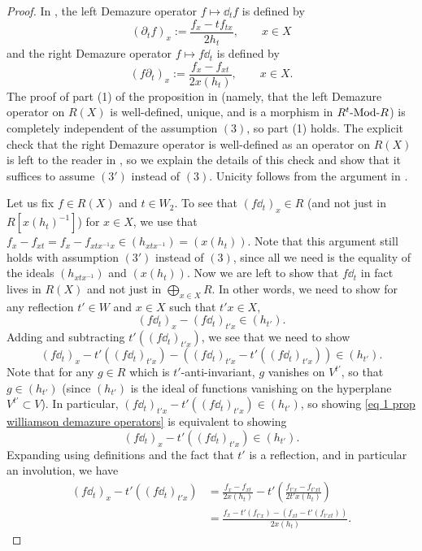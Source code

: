 \begin{proof}
In \cite{WillSingular}, the left Demazure operator $f \mapsto \dd_tf$ is defined by
\begin{equation*}
    (\partial_tf)_x := \frac{f_x - tf_{tx}}{2h_t}, \qquad x \in X
  \end{equation*} 
and the right Demazure operator $f\mapsto f\dd_t$ is defined by
\begin{equation*}
  (f\partial_t)_x := \frac{f_x - f_{xt}}{2x(h_t)},\qquad x\in X.
\end{equation*}
The proof of part (1) of the proposition in \cite{WillSingular} (namely, that the left Demazure operator on $R(X)$ is well-defined, unique, and is a morphism in $\text{${R^t}$-Mod-${R}$}$) is completely independent of the assumption $\hyperref[assumption 3]{(3)}$, so part (1) holds.
The explicit check that the right Demazure operator is well-defined as an operator on $R(X)$ is left to the reader in \cite{WillSingular}, so we explain the details of this check and show that it suffices to assume $\hyperref[assumption 3']{(3')}$ instead of $\hyperref[assumption 3]{(3)}$.  Unicity follows from the argument in \cite{WillSingular}.

Let us fix $f \in R(X)$ and $t\in W_2$. To see that $(f\dd_t)_x \in R$ (and not just in $R[x(h_t)^{-1}]$) for $x\in X$, we use that $f_x-f_{xt}=f_x-f_{xtx^{-1}x} \in (h_{xtx^{-1}})=(x(h_t))$. Note that this argument still holds with assumption $\hyperref[assumption 3']{(3')}$ instead of $\hyperref[assumption 3]{(3)}$, since all we need is the equality of the ideals $(h_{xtx^{-1}})$ and $(x(h_t))$. Now we are left to show that $f\dd_t$ in fact lives in $R(X)$ and not just in $\bigoplus_{x\in X}R$. 
In other words, we need to show for any reflection $t' \in W$ and $x \in X$ such that $t'x \in X$,
\begin{equation*}
    (f\dd_t)_x - (f\dd_t)_{t'x} \in (h_{t'}).
\end{equation*}
Adding and subtracting $t'((f\dd_t)_{t'x})$, we see that we need to show
\begin{equation}\label{eq 1 prop williamson demazure operators}
    (f\dd_t)_x-t'((f\dd_t)_{t'x}) - ((f\dd_t)_{t'x}-t'((f\dd_t)_{t'x})) \in (h_{t'}).
\end{equation}
Note that for any $g \in R$ which is $t'$-anti-invariant, $g$ vanishes on $V^{t'}$, so that $g \in (h_{t'})$ (since $(h_{t'})$ is the ideal of functions vanishing on the hyperplane $V^{t'} \subset V$).
In particular, $(f\dd_t)_{t'x}-t'((f\dd_t)_{t'x}) \in (h_{t'})$, so showing \cref{eq 1 prop williamson demazure operators} is equivalent to showing
\begin{equation}\label{eq 2 prop williamson demazure operators}
    (f\dd_t)_x-t'((f\dd_t)_{t'x}) \in (h_{t'}).
\end{equation}
Expanding using definitions and the fact that $t'$ is a reflection, and in particular an involution, we have 
\begin{align}
    (f\dd_t)_x-t'((f\dd_t)_{t'x}) &= \frac{f_x - f_{xt}}{2x(h_t)}-t'\left(\frac{f_{t'x} - f_{t'xt}}{2t'x(h_t)} \right) \nonumber \\
    &=\frac{f_x-t'(f_{t'x}) - (f_{xt}-t'(f_{t'xt}))}{2x(h_t)}. \label{eq-right demazure}
\end{align}


\end{proof}
